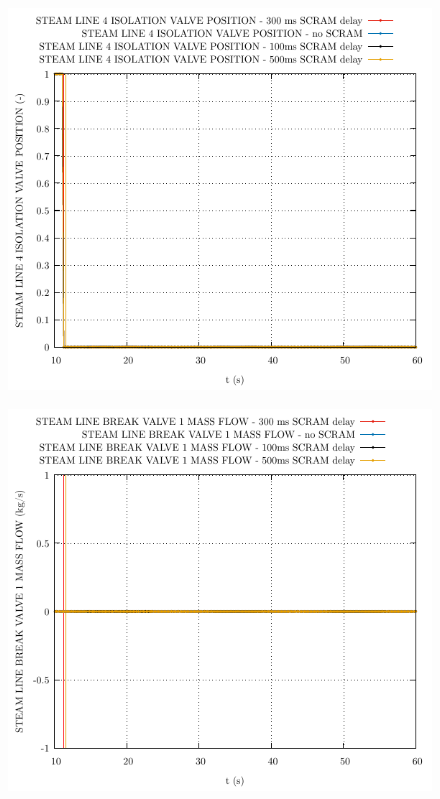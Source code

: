 \documentclass{article}
\begin{document}
\begin{multicols}{2}
\begin{figure}[H]
\end{figure}
\begin{figure}[H]
\centering
\includegraphics[width=\columnwidth]{./graphs/STEAM LINE 4 ISOLATION VALVE POSITION_comp.pdf}
\end{figure}
\begin{figure}[H]
\centering
\includegraphics[width=\columnwidth]{./graphs/STEAM LINE BREAK VALVE 1 MASS FLOW_comp.pdf}

\end{figure}
\end{multicols}
\end{document}

